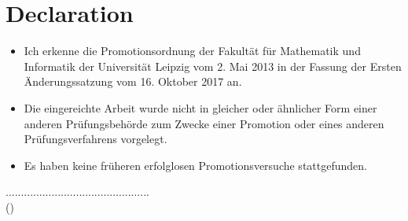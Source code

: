 \chapter*{Declaration}
\thispagestyle{empty}

\begin{itemize}
	\item Ich erkenne die Promotionsordnung der Fakult\"at f\"ur Mathematik und Informatik der Universit\"at Leipzig vom 2. Mai 2013 in der Fassung der Ersten \"Anderungssatzung vom 16. Oktober 2017 an. \vspace{0.2cm}
	
	\item Die eingereichte Arbeit wurde nicht in gleicher oder \"ahnlicher Form einer anderen Pr\"ufungsbeh\"orde zum Zwecke einer Promotion oder eines anderen Pr\"ufungsverfahrens vorgelegt. \vspace{0.2cm}
	
	\item Es haben keine fr\"uheren erfolglosen Promotionsversuche stattgefunden. 
	\vspace{0.2cm}
	
\end{itemize}

\vspace*{1.5cm}
\begin{flushleft}
	...............................................\\
	(\myName)
\end{flushleft}


